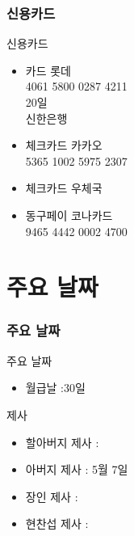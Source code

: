\documentclass[aspectratio=1610,20pt,xcolor=pdftex,dvipsnames,table,handout]{beamer}
\begin{document}
		\begin{frame} [t,plain]
		\frametitle{신용카드}
			\begin{block} {신용카드}
			\setlength{\leftmargini}{1em}			
			\begin{itemize}
				\item 	카드			\hrulefill 롯데 \\ 						
											4061 5800 0287 4211		\hrulefill \\
											20일 	\hrulefill \\
											신한은행 	\hrulefill

				\item 	체크카드		\hrulefill 카카오 \\ 								
											5365 1002 5975 2307	\hrulefill

				\item 	체크카드		\hrulefill 우체국 \\ 									\hrulefill

				\item 	동구페이		\hrulefill 코나카드 \\ 						
											9465 4442 0002 4700	\hrulefill

			\end{itemize}
			\end{block}						
		\end{frame}						



		\section{주요 날짜 }

		\begin{frame} [t,plain]
		\frametitle{주요 날짜 }
			\begin{block} {주요 날짜 }
			\setlength{\leftmargini}{2em}			
			\begin{itemize}
				\item 월급날 :\hrulefill 30일
			\end{itemize}
			\end{block}						
		\end{frame}						


		\begin{frame} [t,plain]
			\begin{block} {제사 }
			\setlength{\leftmargini}{2em}			
			\begin{itemize}
				\item  할아버지 제사 : 
				\item  아버지 제사 : 5월 7일 
				\item 장인 제사 : 
				\item 현찬섭 제사 : 
			\end{itemize}
			\end{block}						
		\end{frame}						
\end{document}
